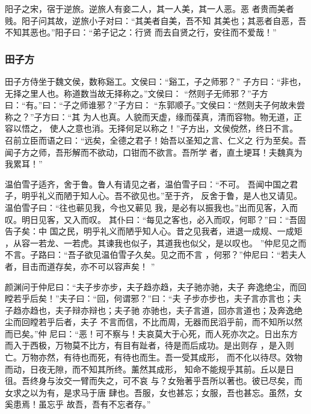\documentclass[]{article}
\begin{document}
阳子之宋，宿于逆旅。逆旅人有妾二人，其一人美，其一人恶。恶
者贵而美者贱。阳子问其故，逆旅小子对曰：``其美者自美，吾不知
其美也；其恶者自恶，吾不知其恶也。''阳子曰：``弟子记之：行贤
而去自贤之行，安往而不爱哉！''

\hypertarget{header-n845}{%
\subsubsection{田子方}\label{header-n845}}

田子方侍坐于魏文侯，数称谿工。文侯曰：``谿工，子之师邪？''
子方曰：``非也，无择之里人也。称道数当故无择称之。''文侯曰：
``然则子无师邪？''子方曰：``有。''曰：``子之师谁邪？''子方曰：
``东郭顺子。''文侯曰：``然则夫子何故未尝称之？''子方曰：``其
为人也真。人貌而天虚，缘而葆真，清而容物。物无道，正容以悟之，
使人之意也消。无择何足以称之！''子方出，文侯傥然，终日不言。
召前立臣而语之曰：``远矣，全德之君子！始吾以圣知之言、仁义之
行为至矣。吾闻子方之师，吾形解而不欲动，口钳而不欲言。吾所学
者，直土埂耳！夫魏真为我累耳！''

温伯雪子适齐，舍于鲁。鲁人有请见之者，温伯雪子曰：``不可。
吾闻中国之君子，明乎礼义而陋于知人心。吾不欲见也。''至于齐，
反舍于鲁，是人也又请见。温伯雪子曰：``往也蕲见我，今也又蕲见
我，是必有以振我也。''出而见客，入而叹。明日见客，又入而叹。
其仆曰：``每见之客也，必入而叹，何耶？''曰：``吾固告子矣：中
国之民，明乎礼义而陋乎知人心。昔之见我者，进退一成规、一成矩
，从容一若龙、一若虎。其谏我也似子，其道我也似父，是以叹也。
''仲尼见之而不言。子路曰：``吾子欲见温伯雪子久矣。见之而不言
，何邪？''仲尼曰：``若夫人者，目击而道存矣，亦不可以容声矣！ ''

颜渊问于仲尼曰：``夫子步亦步，夫子趋亦趋，夫子驰亦驰，夫子
奔逸绝尘，而回瞠若乎后矣！''夫子曰：``回，何谓邪？''曰：``夫
子步亦步也，夫子言亦言也；夫子趋亦趋也，夫子辩亦辩也；夫子驰
亦驰也，夫子言道，回亦言道也；及奔逸绝尘而回瞠若乎后者，夫子
不言而信，不比而周，无器而民滔乎前，而不知所以然而已矣。''仲
尼曰：``恶！可不察与！夫哀莫大于心死，而人死亦次之。日出东方
而入于西极，万物莫不比方，有目有趾者，待是而后成功。是出则存
，是入则亡。万物亦然，有待也而死，有待也而生。吾一受其成形，
而不化以待尽。效物而动，日夜无隙，而不知其所终。薰然其成形，
知命不能规乎其前。丘以是日徂。吾终身与汝交一臂而失之，可不哀
与？女殆著乎吾所以著也。彼已尽矣，而女求之以为有，是求马于唐
肆也。吾服，女也甚忘；女服，吾也甚忘。虽然，女奚患焉！虽忘乎
故吾，吾有不忘者存。''
\end{document}
